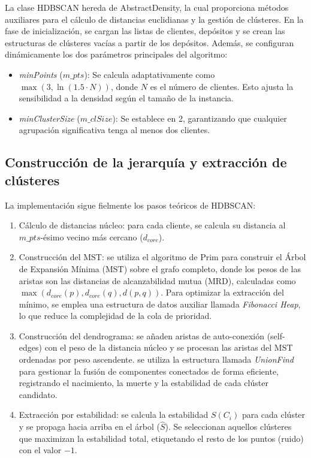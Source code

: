 La clase HDBSCAN hereda de AbstractDensity, la cual proporciona métodos auxiliares para el cálculo de distancias euclidianas y la gestión de clústeres. En la fase de inicialización, se cargan las listas de clientes, depósitos y se crean las estructuras de clústeres vacías a partir de los depósitos. Además, se configuran dinámicamente los dos parámetros principales del algoritmo:
\begin{itemize}
    \item \textit{minPoints} (\(m\_pts\)): Se calcula adaptativamente como \(\max(3, \ln(1.5 \cdot N))\), donde \(N\) es el número de clientes. Esto ajusta la sensibilidad a la densidad según el tamaño de la instancia.
    \item \textit{minClusterSize} (\(m\_clSize\)): Se establece en 2, garantizando que cualquier agrupación significativa tenga al menos dos clientes.
\end{itemize}

\clearpage
\subsection{Construcción de la jerarquía y extracción de clústeres}

La implementación sigue fielmente los pasos teóricos de HDBSCAN:
\begin{enumerate}
    \item Cálculo de distancias núcleo: para cada cliente, se calcula su distancia al \(m\_pts\)-ésimo vecino más cercano (\(d_{core}\)).
    \item Construcción del MST: se utiliza el algoritmo de Prim para construir el Árbol de Expansión Mínima (MST) sobre el grafo completo, donde los pesos de las aristas son las distancias de alcanzabilidad mutua (MRD), calculadas como \(\max(d_{core}(p), d_{core}(q), d(p,q))\). Para optimizar la extracción del mínimo, se emplea una estructura de datos auxiliar llamada \textit{Fibonacci Heap}, lo que reduce la complejidad de la cola de prioridad.
    \item Construcción del dendrograma: se añaden aristas de auto-conexión (self-edges) con el peso de la distancia núcleo y se procesan las aristas del MST ordenadas por peso ascendente. se utiliza la estructura llamada \textit{UnionFind} para gestionar la fusión de componentes conectados de forma eficiente, registrando el nacimiento, la muerte y la estabilidad de cada clúster candidato.
    \item Extracción por estabilidad: se calcula la estabilidad \(S(C_i)\) para cada clúster y se propaga hacia arriba en el árbol (\(\hat{S}\)). Se seleccionan aquellos clústeres que maximizan la estabilidad total, etiquetando el resto de los puntos (ruido) con el valor \(-1\).
\end{enumerate}

